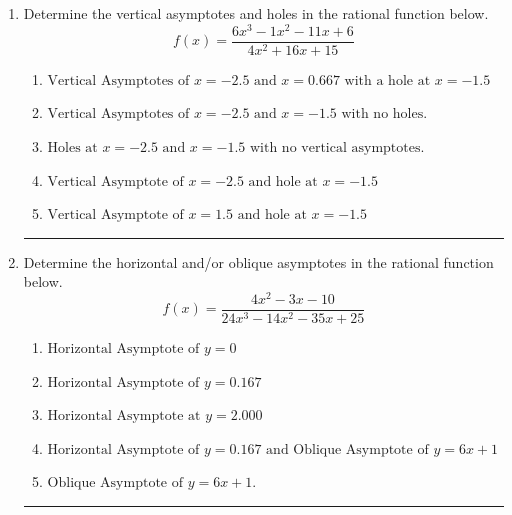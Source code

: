 \documentclass[14pt]{extbook}
\newcommand{\litem}[1]{\item#1\hspace*{-1cm}\rule{\textwidth}{0.4pt}}
\begin{document}
\begin{enumerate}
{\begin{enumerate}[label=\Alph*.]
\end{enumerate} }
\litem{
Determine the vertical asymptotes and holes in the rational function below.\[ f(x) = \frac{6x^{3} -1 x^{2} -11 x + 6}{4x^{2} +16 x + 15} \]\begin{enumerate}[label=\Alph*.]
\item \( \text{Vertical Asymptotes of } x = -2.5 \text{ and } x = 0.667 \text{ with a hole at } x = -1.5 \)
\item \( \text{Vertical Asymptotes of } x = -2.5 \text{ and } x = -1.5 \text{ with no holes.} \)
\item \( \text{Holes at } x = -2.5 \text{ and } x = -1.5 \text{ with no vertical asymptotes.} \)
\item \( \text{Vertical Asymptote of } x = -2.5 \text{ and hole at } x = -1.5 \)
\item \( \text{Vertical Asymptote of } x = 1.5 \text{ and hole at } x = -1.5 \)

\end{enumerate} }
\litem{
Determine the horizontal and/or oblique asymptotes in the rational function below.\[ f(x) = \frac{4x^{2} -3 x -10}{24x^{3} -14 x^{2} -35 x + 25} \]\begin{enumerate}[label=\Alph*.]
\item \( \text{Horizontal Asymptote of } y = 0 \)
\item \( \text{Horizontal Asymptote of } y = 0.167  \)
\item \( \text{Horizontal Asymptote at } y = 2.000 \)
\item \( \text{Horizontal Asymptote of } y = 0.167 \text{ and Oblique Asymptote of } y = 6x + 1 \)
\item \( \text{Oblique Asymptote of } y = 6x + 1. \)

\end{enumerate} }
\end{enumerate}
\end{document}
